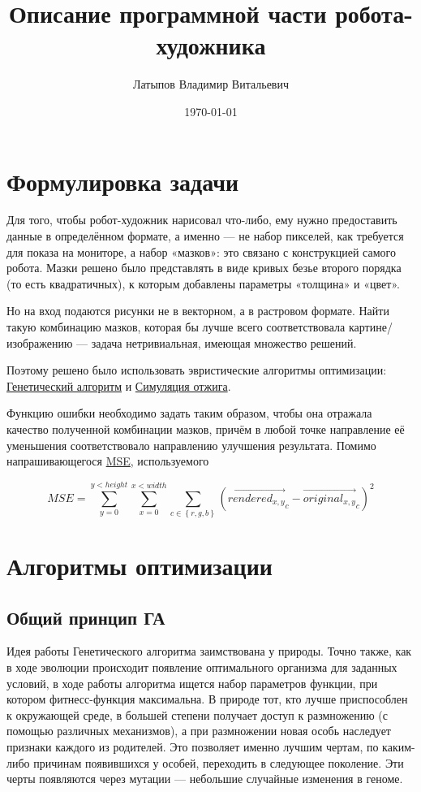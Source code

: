 \documentclass[11pt]{article}
\title{Описание программной части робота-художника}
\author{Латыпов Владимир Витальевич}
\date{\today}
\begin{document}
    \maketitle



    \section{Формулировка задачи}

    Для того, чтобы робот-художник нарисовал что-либо, ему нужно предоставить данные в определённом формате, а именно — не набор пикселей,
    как требуется для показа на мониторе, а набор «мазков»: это связано с конструкцией самого робота.
    Мазки решено было представлять в виде кривых безье второго порядка (то есть квадратичных), к которым добавлены параметры «толщина» и «цвет».

    Но на вход подаются рисунки не в векторном, а в растровом формате.
    Найти такую комбинацию мазков, которая бы лучше всего соответствовала картине/изображению — задача нетривиальная, имеющая множество решений.

    Поэтому решено было использовать эвристические алгоритмы оптимизации:
    \href{https://en.wikipedia.org/wiki/Simulated_annealing}{Генетический алгоритм} и \href{https://en.wikipedia.org/wiki/Simulated_annealing}{Симуляция отжига}.

    Функцию ошибки необходимо задать таким образом, чтобы она отражала качество полученной комбинации мазков,
    причём в любой точке направление её уменьшения соответствовало направлению улучшения результата.
    Помимо напрашивающегося \href{https://en.wikipedia.org/wiki/Mean_squared_error}{MSE}, используемого

    \begin{equation}\label{eq:equation}
        MSE = \sum_{y = 0}^{y < height} { \sum_{x = 0}^{x < width} { \sum_{c \in  \left\{ r, g, b \right\} } { \left( {\overrightarrow {rendered_{x, y}}}_c - {\overrightarrow{original_{x, y}}}_c\right)^2 }}}
    \end{equation}


    \section {Алгоритмы оптимизации}

    \subsection{Общий принцип ГА}
    Идея работы Генетического алгоритма заимствована у природы.
    Точно также, как в ходе эволюции происходит появление оптимального организма для заданных условий,
    в ходе работы алгоритма ищется набор параметров функции, при котором фитнесс-функция максимальна.
    В природе тот, кто лучше приспособлен к окружающей среде, в большей степени получает доступ к размножению (с помощью различных механизмов),
    а при размножении новая особь наследует признаки каждого из родителей.
    Это позволяет именно лучшим чертам, по каким-либо причинам появившихся у особей, переходить в следующее поколение.
    Эти черты появляются через мутации — небольшие случайные изменения в геноме.
\end{document}
